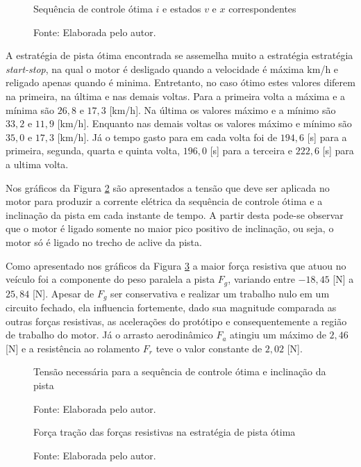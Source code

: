 \begin{figure}[H]
    \centering
    \caption{Sequência de controle ótima $i$ e estados $v$ e $x$ correspondentes}
    
    \label{graf:resultadoOCP}
    \caption*{\footnotesize{Fonte: Elaborada pelo autor.}}
\end{figure}

A estratégia de pista ótima encontrada se assemelha muito a estratégia estratégia \textit{start-stop}, na qual o motor é desligado quando a velocidade é máxima
km/h e religado apenas quando é minima. Entretanto, no caso ótimo estes valores diferem na primeira, na última e nas demais voltas. Para a primeira volta a máxima e a mínima são
$26,8$ e $17,3$ [km/h]. Na última  os valores máximo e a mínimo são $33,2$ e $11,9$ [km/h]. Enquanto nas demais voltas os valores máximo e mínimo são $35,0$ e $17,3$ [km/h]. Já o tempo 
gasto para em cada volta foi de $194,6$ [s] para a primeira, segunda, quarta e quinta volta, $196,0$ [s] para a terceira e $222,6$ [s] para a ultima volta.

Nos gráficos da Figura \ref{graf:resultadotensao} são apresentados a tensão que deve ser aplicada no motor para produzir a corrente elétrica da sequência de controle ótima e a inclinação da pista em cada instante de tempo.
A partir desta pode-se observar que o motor é ligado somente no maior pico positivo de inclinação, ou seja, o motor só é ligado no trecho de aclive da pista.

Como apresentado nos gráficos da Figura \ref{graf:resultadoForcas} a maior força resistiva que atuou no veículo foi a componente do peso paralela a pista $F_g$, variando entre $-18,45$ [N] a $25,84$ [N]. Apesar de $F_g$ ser conservativa
e realizar um trabalho nulo em um circuito fechado, ela influencia fortemente, dado sua magnitude comparada as outras forças resistivas, as acelerações do protótipo e consequentemente a região de trabalho do motor.
Já o arrasto aerodinâmico $F_a$ atingiu um máximo de $2,46$ [N] e a resistência ao rolamento $F_r$ teve o valor constante de $2,02$ [N].  

\begin{figure}[h]
    \centering
    \caption{Tensão necessária para a sequência de controle ótima e inclinação da pista}
    
    \label{graf:resultadotensao}
    \caption*{\footnotesize{Fonte: Elaborada pelo autor.}}
\end{figure}

\begin{figure}[h]
    \centering
    \caption{Força tração das forças resistivas na estratégia de pista ótima}
    
    \label{graf:resultadoForcas}
    \caption*{\footnotesize{Fonte: Elaborada pelo autor.}}
\end{figure}







\clearpage